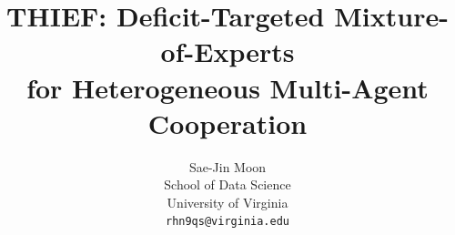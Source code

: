 \documentclass{article}
\title{THIEF: Deficit-Targeted Mixture-of-Experts\\for Heterogeneous Multi-Agent Cooperation}
\author{%
  Sae-Jin Moon \\
  School of Data Science \\
  University of Virginia \\
  \texttt{rhn9qs@virginia.edu}
}
\begin{document}
\maketitle

\begin{abstract}

\end{abstract}










\setlength{\bibsep}{2.5pt}



\clearpage


\clearpage

\end{document}
